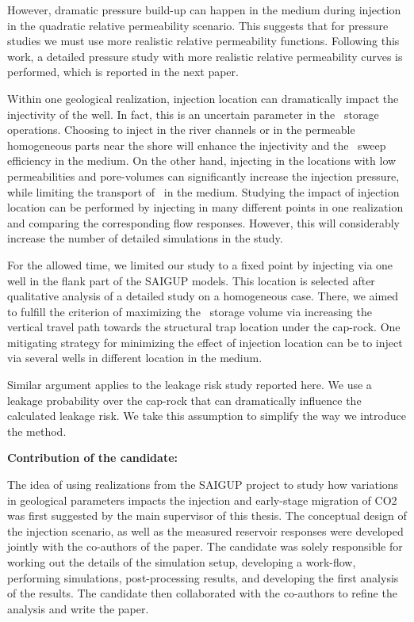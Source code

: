 {However, dramatic pressure build-up can happen in the medium during injection
in the quadratic relative permeability scenario. This suggests that for
pressure studies we must use more realistic relative permeability functions.
 Following this work, a detailed pressure study with more realistic relative
permeability curves is performed, which is reported in the next paper.

Within one geological realization, injection location can dramatically impact the injectivity of the well. In fact, this is an uncertain parameter in the \coo\ storage operations. Choosing to inject in the river channels or in the permeable homogeneous parts near the shore will enhance the injectivity and the \coo\ sweep efficiency in the medium. On the other hand, injecting in the locations with low permeabilities and pore-volumes can significantly increase the injection pressure, while limiting the transport of \coo\ in the medium. Studying the impact of injection location can be performed by injecting in many different points in one realization and comparing the corresponding flow responses. However, this will considerably increase the number of detailed simulations in the study. 

For the allowed time, we limited our study to a fixed point by injecting via one well in the flank part of the SAIGUP models. This location is selected after qualitative analysis of a detailed study on a homogeneous case. There, we aimed to fulfill the criterion of maximizing the \coo\ storage volume via increasing the vertical travel path towards the structural trap location under the cap-rock. One mitigating strategy for minimizing the effect of injection location can be to inject via several wells in different location in the medium.  

Similar argument applies to the leakage risk study reported here. We use a leakage probability over the cap-rock that can dramatically influence the calculated leakage risk. We take this assumption to simplify the way we introduce the method. 

\vspace{0.5cm}
\noindent\textbf{Contribution of the candidate:}

The idea of using realizations from the SAIGUP project to study how variations in geological parameters impacts the injection and early-stage migration of CO2 was first suggested by the main supervisor of this thesis. The conceptual design of the injection scenario, as well as the measured reservoir responses were developed jointly with the co-authors of the paper. The candidate was solely responsible for working out the details of the simulation setup, developing a work-flow, performing simulations, post-processing results, and developing the first analysis of the results. The candidate then collaborated with the co-authors to refine the analysis and write the paper.
}

